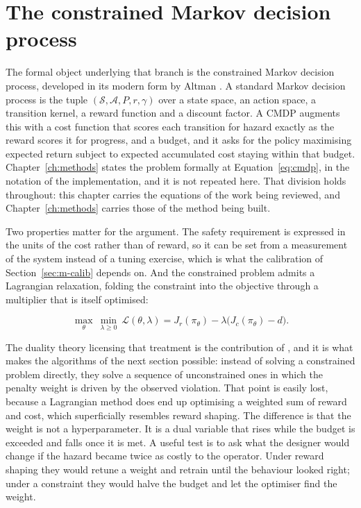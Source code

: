 \section{The constrained Markov decision process}\label{sec:b-cmdp}

The formal object underlying that branch is the constrained Markov decision process, developed
in its modern form by Altman \cite{altman1999cmdp}. A standard Markov decision process is the
tuple \((\mathcal{S},\mathcal{A},P,r,\gamma)\) over a state space, an action space, a transition
kernel, a reward function and a discount factor. A CMDP augments this with a cost function that
scores each transition for hazard exactly as the reward scores it for progress, and a budget,
and it asks for the policy maximising expected return subject to expected accumulated cost
staying within that budget. Chapter~\ref{ch:methods} states the problem formally at
Equation~\eqref{eq:cmdp}, in the notation of the implementation, and it is not repeated here.
That division holds throughout: this chapter carries the equations of the work being reviewed,
and Chapter~\ref{ch:methods} carries those of the method being built.

Two properties matter for the argument. The safety requirement is expressed in the units of the
cost rather than of reward, so it can be set from a measurement of the system instead of a
tuning exercise, which is what the calibration of Section~\ref{sec:m-calib} depends on. And the
constrained problem admits a Lagrangian relaxation, folding the constraint into the objective
through a multiplier that is itself optimised:

\begin{equation}\label{eq:b-lagrangian}
\max_{\theta}\ \min_{\lambda\ge 0}\ \mathcal{L}(\theta,\lambda)
= J_{r}(\pi_{\theta}) - \lambda\bigl(J_{c}(\pi_{\theta}) - d\bigr).
\end{equation}

The duality theory licensing that treatment is the contribution of \cite{altman1999cmdp}, and it
is what makes the algorithms of the next section possible: instead of solving a constrained
problem directly, they solve a sequence of unconstrained ones in which the penalty weight is
driven by the observed violation. That point is easily lost, because a Lagrangian method does
end up optimising a weighted sum of reward and cost, which superficially resembles reward
shaping. The difference is that the weight is not a hyperparameter. It is a dual variable that
rises while the budget is exceeded and falls once it is met. A useful test is to ask what the
designer would change if the hazard became twice as costly to the operator. Under reward shaping
they would retune a weight and retrain until the behaviour looked right; under a constraint they
would halve the budget and let the optimiser find the weight.

